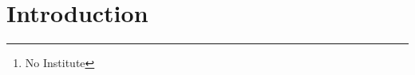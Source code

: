 \documentclass[runningheads,a4paper]{llncs}
\newcommand{\keywords}[1]{\par\addvspace\baselineskip
\noindent\keywordname\enspace\ignorespaces#1}
\begin{document}
\mainmatter  %

\title{}

\titlerunning{}

%
%

\author{A. N. Onymous%
\thanks{No Institute}}



%
%

\maketitle

%
%
\begin{abstract}

\end{abstract}

%
%
\section{Introduction}
\label{sec:intro}



\end{document}
